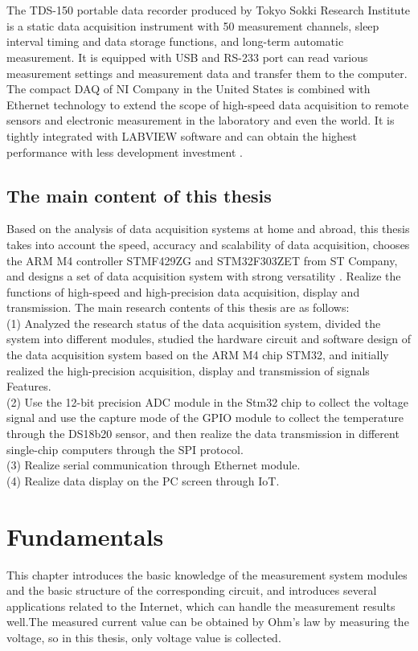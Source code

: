\\
\\
The TDS-150 portable data recorder produced by Tokyo Sokki Research Institute is a static data acquisition instrument with 50 measurement channels, sleep interval timing and data storage functions, and long-term automatic measurement. It is equipped with USB and RS-233 port can read various measurement settings and measurement data and transfer them to the computer. The compact DAQ of NI Company in the United States is combined with Ethernet technology to extend the scope of high-speed data acquisition to remote sensors and electronic measurement in the laboratory and even the world. It is tightly integrated with LABVIEW software and can obtain the highest performance with less development investment \cite{wang2012labview}.

\section{The main content of this thesis}
\label{The main content of this thesis}
Based on the analysis of data acquisition systems at home and abroad, this thesis takes into account the speed, accuracy and scalability of data acquisition, chooses the ARM M4 controller STMF429ZG \cite{f429datasheet} and STM32F303ZET \cite{f303datasheet}from ST Company, and designs a set of data acquisition system with strong versatility . Realize the functions of high-speed and high-precision data acquisition, display and transmission. The main research contents of this thesis are as follows:
\\
(1) Analyzed the research status of the data acquisition system, divided the system into different modules, studied the hardware circuit and software design of the data acquisition system based on the ARM M4 chip STM32, and initially realized the high-precision acquisition, display and transmission of signals Features.
\\
(2) Use the 12-bit precision ADC module in the Stm32 chip to collect the voltage signal and use the capture mode of the GPIO module to collect the temperature through the DS18b20 sensor, and then realize the data transmission in different single-chip computers through the SPI protocol.
\\
(3) Realize serial communication through Ethernet module.
\\
(4) Realize data display on the PC screen through IoT.
 


\chapter{Fundamentals}
\label{chap:Fundamentals}
This chapter introduces the basic knowledge of the measurement system modules and the basic structure of the corresponding circuit, and introduces several applications related to the Internet, which can handle the measurement results well.The measured current value can be obtained by Ohm's law by measuring the voltage, so in this thesis, only voltage value is collected.
